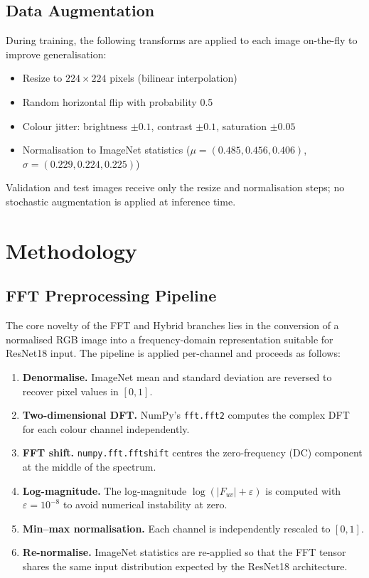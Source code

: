 \documentclass[12pt, a4paper]{article}
\begin{document}
\subsection{Data Augmentation}

During training, the following transforms are applied to each image
on-the-fly to improve generalisation:
\begin{itemize}[leftmargin=1.8em]
  \item Resize to $224 \times 224$ pixels (bilinear interpolation)
  \item Random horizontal flip with probability 0.5
  \item Colour jitter: brightness $\pm 0.1$, contrast $\pm 0.1$,
    saturation $\pm 0.05$
  \item Normalisation to ImageNet statistics
    ($\mu = (0.485, 0.456, 0.406)$, $\sigma = (0.229, 0.224, 0.225)$)
\end{itemize}

Validation and test images receive only the resize and normalisation steps;
no stochastic augmentation is applied at inference time.

\section{Methodology}
\label{sec:method}

\subsection{FFT Preprocessing Pipeline}
\label{sec:fftpre}

The core novelty of the FFT and Hybrid branches lies in the conversion of a
normalised RGB image into a frequency-domain representation suitable for
ResNet18 input.  The pipeline is applied per-channel and proceeds as follows:

\begin{enumerate}[leftmargin=1.8em]
  \item \textbf{Denormalise.}  ImageNet mean and standard deviation are
    reversed to recover pixel values in $[0,1]$.
  \item \textbf{Two-dimensional DFT.}  NumPy's \texttt{fft.fft2} computes the
    complex DFT for each colour channel independently.
  \item \textbf{FFT shift.}  \texttt{numpy.fft.fftshift} centres the
    zero-frequency (DC) component at the middle of the spectrum.
  \item \textbf{Log-magnitude.}  The log-magnitude $\log(|F_{uv}| + \varepsilon)$
    is computed with $\varepsilon = 10^{-8}$ to avoid numerical instability
    at zero.
  \item \textbf{Min–max normalisation.}  Each channel is independently
    rescaled to $[0,1]$.
  \item \textbf{Re-normalise.}  ImageNet statistics are re-applied so that
    the FFT tensor shares the same input distribution expected by the
    ResNet18 architecture.
\end{enumerate}
\end{document}
